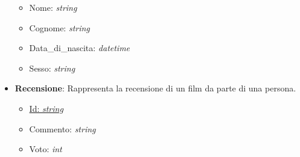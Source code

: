 \documentclass[10pt]{article}
\begin{document}
\begin{itemize}
\begin{itemize}
			\item Nome: \textit{string}
			\item Cognome: \textit{string}
			\item Data\_di\_nascita: \textit{datetime}	
			\item Sesso: \textit{string}
		\end{itemize}
		\item \textbf{Recensione}: Rappresenta la recensione di un film da parte di una persona.
		\begin{itemize}
			\item \underline{Id: \textit{string}}
			\item Commento: \textit{string}
			\item Voto: \textit{int}
		\end{itemize}
	\end{itemize}
\end{document}
